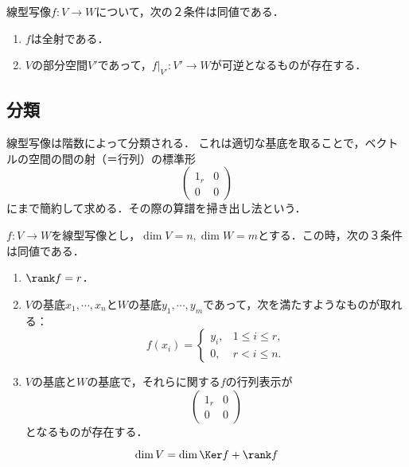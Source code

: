 \documentclass[uplatex, dvipdfmx]{jsreport}
\begin{document}
\begin{corollary}
    線型写像$f:V\to W$について，次の２条件は同値である．
    \begin{enumerate}
        \item $f$は全射である．
        \item $V$の部分空間$V'$であって，$f|_{V'}:V'\to W$が可逆となるものが存在する．
    \end{enumerate}
\end{corollary}

\subsection{分類}

\begin{tcolorbox}[colframe=ForestGreen, colback=ForestGreen!10!white, breakable]
    線型写像は階数によって分類される．
    これは適切な基底を取ることで，ベクトルの空間の間の射（＝行列）の標準形
    \[\begin{pmatrix}1_r&0\\0&0\end{pmatrix}\]
    にまで簡約して求める．その際の算譜を掃き出し法という．
\end{tcolorbox}

\begin{proposition}[線型写像の階数による分類]
    $f:V\to W$を線型写像とし，$\dim V=n, \dim W=m$とする．この時，次の３条件は同値である．
    \begin{enumerate}
        \item $\rank f=r$．
        \item $V$の基底$x_1,\cdots,x_n$と$W$の基底$y_1,\cdots,y_m$であって，次を満たすようなものが取れる：
        \[f(x_i)=\begin{cases}
            y_i,&1\le i\le r,\\
            0,&r<i\le n.
        \end{cases}\]
        \item $V$の基底と$W$の基底で，それらに関する$f$の行列表示が\[\begin{pmatrix}1_r&0\\0&0\end{pmatrix}\]となるものが存在する．
    \end{enumerate}
\end{proposition}

\begin{corollary}[次元定理]\label{cor-thm-of-dimention}
    \[ \dim V=\dim\Ker f+\rank f \]
\end{corollary}
\end{document}
